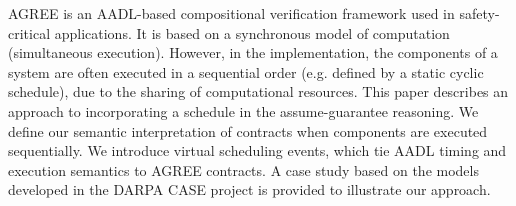 AGREE is an AADL-based compositional verification framework used in safety-critical applications. It is based on a synchronous model of computation (simultaneous execution). However, in the implementation, the components of a system are often executed in a sequential order (e.g. defined by a static cyclic schedule), due to the sharing of computational resources. This paper describes an approach to incorporating a schedule in the assume-guarantee reasoning. We define our semantic interpretation of contracts when components are executed sequentially. We introduce virtual scheduling events, which tie AADL timing and execution semantics to AGREE contracts. A case study based on the models developed in the DARPA CASE project is provided to illustrate our approach.